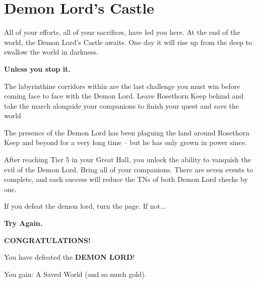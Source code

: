 \chapter{Demon Lord's Castle}

All of your efforts, all of your sacrifices, have led you here. At the end of the world, the Demon Lord’s Castle awaits. One day it will rise up from the deep to swallow the world in darkness.

\skipline

\textbf{Unless you stop it.}

\skipline

The labyrinthine corridors within are the last challenge you must win before coming face to face with the Demon Lord. Leave Rosethorn Keep behind and take the march alongside your companions to finish your quest and save the world

\skipline

The presence of the Demon Lord has been plaguing the land around Rosethorn Keep and beyond for a very long time – but he has only grown in power since.

\skipline

After reaching Tier 5 in your Great Hall, you unlock the ability to vanquish the evil of the Demon Lord. Bring all of your companions. There are seven events to complete, and each success will reduce the TNs of both Demon Lord checks by one.

\pagebreak

\thispagestyle{empty}

\vspace*{\fill}
\begin{adjustbox}{center}
\end{adjustbox}
\vspace*{0pt}
%

\pagebreak



If you defeat the demon lord, turn the page. If not...
\skipline
\skipline

\begin{adjustbox}{center}
	\textbf{Try Again.}
\end{adjustbox}

\pagebreak

\thispagestyle{empty}
\vspace*{\fill}
\begin{adjustbox}{center}
\end{adjustbox}
\begin{adjustbox}{center}
	\textbf{CONGRATULATIONS!}
\end{adjustbox}
\begin{adjustbox}{center}
	You have defeated the \textbf{DEMON LORD}!
\end{adjustbox}
\begin{adjustbox}{center}
	You gain: A Saved World (and so much gold).
\end{adjustbox}
\vspace*{\fill}
%




